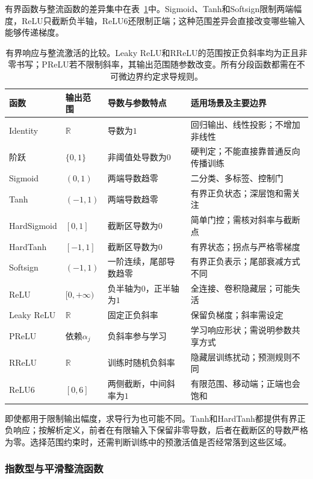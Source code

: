 有界函数与整流函数的差异集中在表~\ref{tab:ffn-activation-bounded}中。Sigmoid、Tanh和Softsign限制两端幅度，ReLU只截断负半轴，ReLU6还限制正端；这种范围差异会直接改变哪些输入能够传递梯度。

\begin{table}[htb]
  \centering
  \small
  \begin{tabularx}{\linewidth}{@{}l l X X@{}}
    \toprule
    函数 & 输出范围 & 导数与参数特点 & 适用场景及主要边界 \\
    \midrule
    Identity & $\mathbb{R}$ & 导数为$1$ & 回归输出、线性投影；不增加非线性 \\
    阶跃 & $\{0,1\}$ & 非阈值处导数为$0$ & 硬判定；不能直接靠普通反向传播训练 \\
    Sigmoid & $(0,1)$ & 两端导数趋零 & 二分类、多标签、控制门 \\
    Tanh & $(-1,1)$ & 两端导数趋零 & 有界正负状态；深层饱和需关注 \\
    HardSigmoid & $[0,1]$ & 截断区导数为$0$ & 简单门控；需核对斜率与截断点 \\
    HardTanh & $[-1,1]$ & 截断区导数为$0$ & 有界状态；拐点与严格零梯度 \\
    Softsign & $(-1,1)$ & 一阶连续，尾部导数趋零 & 有界正负表示；尾部衰减方式不同 \\
    ReLU & $[0,+\infty)$ & 负半轴为$0$，正半轴为$1$ & 全连接、卷积隐藏层；可能失活 \\
    Leaky ReLU & $\mathbb{R}$ & 固定正负斜率 & 保留负梯度；斜率需设定 \\
    PReLU & 依赖$\alpha_j$ & 负斜率参与学习 & 学习响应形状；需说明参数共享方式 \\
    RReLU & $\mathbb{R}$ & 训练时随机负斜率 & 隐藏层训练扰动；预测规则不同 \\
    ReLU6 & $[0,6]$ & 两侧截断，中间斜率为$1$ & 有限范围、移动端；正端也会饱和 \\
    \bottomrule
  \end{tabularx}
  \caption{有界响应与整流激活的比较。Leaky ReLU和RReLU的范围按正负斜率均为正且非零书写；PReLU若不限制斜率，其输出范围随参数改变。所有分段函数都需在不可微边界约定求导规则。}
  \label{tab:ffn-activation-bounded}
\end{table}

即使都用于限制输出幅度，求导行为也可能不同。Tanh和HardTanh都提供有界正负响应；按解析定义，前者在有限输入下保留非零导数，后者在截断区的导数严格为零。选择范围约束时，还需判断训练中的预激活值是否经常落到这些区域。

\subsubsection{指数型与平滑整流函数}
\label{sec:ffn-activation-exponential}

